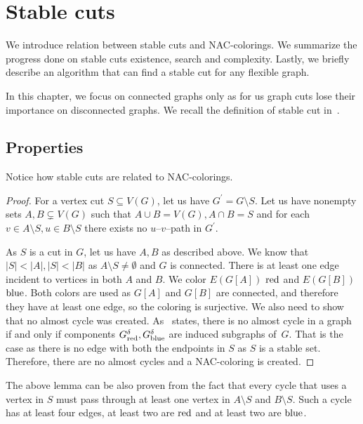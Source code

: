 
\chapter{Stable cuts}%
\label{chapter:stable_cuts}

\begin{chapterabstract}
	We introduce relation between stable cuts and NAC-colorings.
	We summarize the progress done on stable cuts existence, search and complexity.
	Lastly, we briefly describe an algorithm that can find a stable cut
	for any flexible graph.
\end{chapterabstract}


In this chapter, we focus on connected graphs only as for us graph cuts
lose their importance on disconnected graphs.
We recall the definition of
stable cut in~.

\section{Properties}

Notice how stable cuts are related to NAC-colorings.
%
%
\begin{proof}
	For a vertex cut \( S \subseteq V(G) \), let us have \( G^\prime = G \setminus S \).
	Let us have nonempty sets \( A, B \subsetneq V(G) \) such that
	\( A \cup B = V(G), A \cap B = S \) and for each \( v \in A \setminus S, u \in B \setminus S \)
	there exists no \( u \)--\( v \)--path in \( G^\prime \).

	As \( S \) is a cut in \( G \), let us have \( A, B \) as described above.
	We know that \( |S| < |A|, |S| < |B| \)
	as \( A\setminus S \ne \emptyset{} \) and \( G \) is connected.
	There is at least one edge incident to vertices in both \( A \) and \( B \).
	We color \( E(G[A]) \) \( \text{red} \) and \( E(G[B]) \) \( \text{blue} \).
	Both colors are used as \( G[A] \) and \( G[B] \) are connected,
	and therefore they have at least one edge,
	so the coloring is surjective.
	We also need to show that no almost cycle was created.
	As~
	states, there is no almost cycle in a graph if and only
	if components \( G_{\text{red}}^\delta, G_{\text{blue}}^\delta \)
	are induced subgraphs of~\( G \).
	That is the case as there is no edge with both the endpoints in \( S \)
	as \( S \) is a stable set.
	Therefore, there are no almost cycles and a NAC-coloring is created.
\end{proof}
%
The above lemma can be also proven from the fact that every cycle that
uses a vertex in \( S \) must pass
through at least one vertex in \( A \setminus S \) and \( B \setminus S \).
Such a cycle has at least four edges,
at least two are \( \text{red} \) and at least two are \( \text{blue} \).

